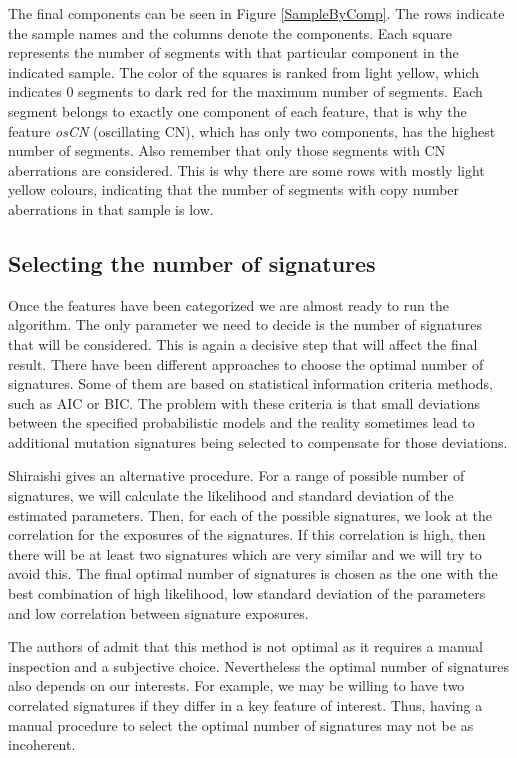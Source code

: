 \documentclass[a4paper]{article}
\begin{document}
The final components can be seen in Figure \ref{SampleByComp}. The rows indicate the sample names and the columns denote the components. Each square represents the number of segments with that particular component in the indicated sample. The color of the squares is ranked from light yellow, which indicates 0 segments to dark red for the maximum number of segments. Each segment belongs to exactly one component of each feature, that is why the feature \textit{osCN} (oscillating CN), which has only two components, has the highest number of segments. Also remember that only those segments with CN aberrations are considered. This is why there are some rows with mostly light yellow colours, indicating that the number of segments with copy number aberrations in that sample is low. 
 
 \subsection{Selecting the number of signatures}
 Once the features have been categorized we are almost ready to run the algorithm. The only parameter we need to decide is the number of signatures that will be considered. This is again a decisive step that will affect the final result. There have been different approaches to choose the optimal number of signatures. Some of them are based on statistical information criteria methods, such as AIC or BIC. The problem with these criteria is that small deviations between the specified probabilistic models and the reality sometimes lead to additional mutation signatures being selected to compensate for those deviations.
 
Shiraishi gives an alternative procedure. For a range of possible number of signatures, we will calculate the likelihood and standard deviation of the estimated parameters. Then, for each of the possible signatures, we look at the correlation for the exposures of the signatures. If this correlation is high, then there will be at least two signatures which are very similar and we will try to avoid this. The final optimal number of signatures is chosen as the one with the best combination of high likelihood, low standard deviation of the parameters and low correlation between signature exposures.
 
 The authors of \cite{Shira} admit that this method is not optimal as it requires a manual inspection and a subjective choice. Nevertheless the optimal number of signatures also depends on our interests. For example, we may be willing to have two correlated signatures if they differ in a key feature of interest. Thus, having a manual procedure to select the optimal number of signatures may not be as incoherent. 
 
\end{document}
